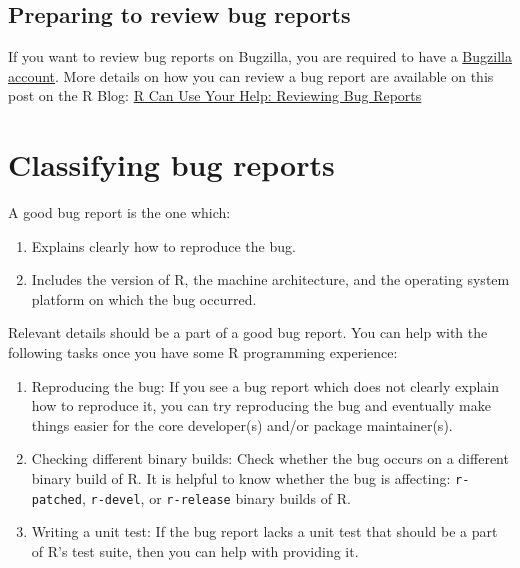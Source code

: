 \documentclass[
]{book}
\begin{document}
\hypertarget{preparing-to-review-bug-reports}{%
\subsection{Preparing to review bug reports}\label{preparing-to-review-bug-reports}}

If you want to review bug reports on Bugzilla, you are required to have a \protect\hyperlink{bugzilla-account}{Bugzilla account}. More details on how you can review a bug report are available on this post on the R Blog: \href{https://blog.r-project.org/2019/10/09/r-can-use-your-help-reviewing-bug-reports/index.html}{R Can Use Your Help: Reviewing Bug Reports}

\hypertarget{classifying-bug-reports}{%
\section{Classifying bug reports}\label{classifying-bug-reports}}

A good bug report is the one which:

\begin{enumerate}
\def\labelenumi{\arabic{enumi}.}
\item
  Explains clearly how to reproduce the bug.
\item
  Includes the version of R, the machine architecture, and the operating system platform on which the bug occurred.
\end{enumerate}

Relevant details should be a part of a good bug report. You can help with the following tasks once you have some R programming experience:

\begin{enumerate}
\def\labelenumi{\arabic{enumi}.}
\item
  Reproducing the bug: If you see a bug report which does not clearly explain how to reproduce it, you can try reproducing the bug and eventually make things easier for the core developer(s) and/or package maintainer(s).
\item
  Checking different binary builds: Check whether the bug occurs on a different binary build of R. It is helpful to know whether the bug is affecting: \texttt{r-patched}, \texttt{r-devel}, or \texttt{r-release} binary builds of R.
\item
  Writing a unit test: If the bug report lacks a unit test that should be a part of R's test suite, then you can help with providing it.
\end{enumerate}
\end{document}
